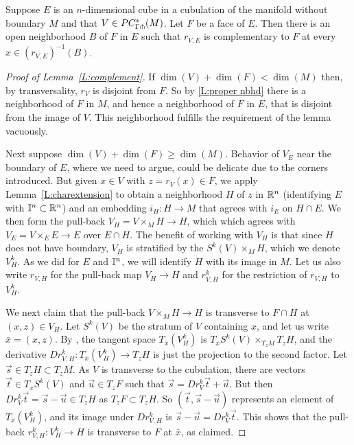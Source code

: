 
\begin{lemma}\label{L:complement}
	Suppose $E$ is an $n$-dimensional cube in a cubulation of the manifold without boundary $M$ and that $V \in PC^*_{\Gamma \pitchfork}(M)$.
	Let $F$ be a face of $E$.
	Then there is an open neighborhood $B$ of $F$ in $E$ such that $r_{V,E}$ is complementary to $F$ at every $x \in (r_{V,E})^{-1}(B)$.
\end{lemma}


\begin{proof}[Proof of Lemma~\ref{L:complement}]
	If $\dim(V) + \dim(F) < \dim(M)$ then, by  transversality,  $r_V$ is disjoint from $F$.  So by \cref{L:proper nbhd} there is a neighborhood of $F$ in $M$, and hence a neighborhood of $F$ in $E$, that is disjoint from the image of $V$.
	This neighborhood fulfills the requirement of the lemma vacuously.

	Next suppose $\dim(V) + \dim(F) \geq \dim(M)$.
	Behavior of $V_E$ near the boundary of $E$, where we need to argue, could be delicate due to the corners introduced.
	But given $x \in V$ with $z = r_V(x) \in F$, we apply Lemma~\ref{L:charextension} to obtain a neighborhood $H$ of $z$ in $\mathbb{R}^n$ (identifying $E$ with $\mathbb{I}^n \subset \mathbb{R}^n$) and an embedding $i_H \colon H \to M$ that agrees with $i_E$ on $H \cap E$.
	We then form the pull-back $V_H = V \times_M H \to H$, which which agrees with $V_E = V \times_E E \to E$ over $E \cap H$.
	The benefit of working with $V_H$ is that since $H$ does not have boundary, $V_H$ is stratified by the $S^k(V) \times_M H$, which we denote $V_H^k$.
	As we did for $E$ and $\mathbb{I}^n$, we will identify $H$ with its image in $M$.
	Let us also write $r_{V,H}$ for the pull-back map $V_H \to H$ and $r_{V,H}^k$ for the restriction of $r_{V,H}$ to $V_H^k$.

	We next claim that the pull-back $V \times_M H \to H$ is transverse to $F \cap H$ at $(x,z) \in V_H$.
	Let $S^k(V)$ be the stratum of $V$ containing $x$, and let us write $\bar{x} = (x,z)$.
	By \cite[Lemma 2.28 and Corollary 2.29]{medina2022foundations}, the tangent space $T_{\bar{x}}(V^k_H)$ is $T_xS^k(V) \times_{T_zM} T_zH$, and the derivative $Dr_{V,H}^k \colon T_{\bar{x}}(V^k_H) \to T_zH$ is just the projection to the second factor.
	Let $\vec s \in T_zH \subset T_z M$.
	As $V$ is transverse to the cubulation, there are vectors $\vec t \in T_xS^k(V)$ and $\vec u \in T_zF$ such that $\vec s = Dr^k_V \vec t + \vec u$.
	But then $Dr^k_V\vec t = \vec s - \vec u \in T_zH$ as $T_zF \subset T_zH$.
	So $(\vec t, \vec s - \vec u)$ represents an element of $T_{\bar{x}}(V^k_H)$, and its image under $Dr_{V,H}^k$ is $\vec s - \vec u = Dr^k_V\vec t$.
	This shows that the pull-back $r^k_{V,H} \colon V^k_H \to H$ is transverse to $F$ at $\bar{x}$, as claimed.



\end{proof}
